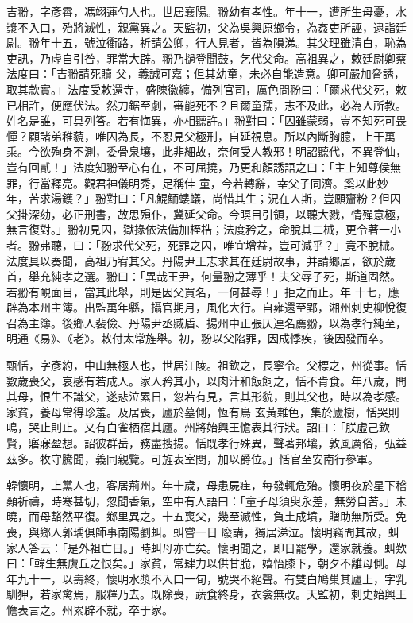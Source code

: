 \begin{pinyinscope}
 吉翂，字彥霄，馮翊蓮勺人也。世居襄陽。翂幼有孝性。年十一，遭所生母憂，水漿不入口，殆將滅性，親黨異之。天監初，父為吳興原鄉令，為姦吏所誣，逮詣廷尉。翂年十五，號泣衢路，祈請公卿，行人見者，皆為隕涕。其父理雖清白，恥為吏訊，乃虛自引咎，罪當大辟。翂乃撾登聞鼓，乞代父命。高祖異之，敕廷尉卿蔡法度曰：「吉翂請死贖
 父，義誠可嘉；但其幼童，未必自能造意。卿可嚴加脅誘，取其款實。」法度受敕還寺，盛陳徽纏，備列官司，厲色問翂曰：「爾求代父死，敕已相許，便應伏法。然刀鋸至劇，審能死不？且爾童孺，志不及此，必為人所教。姓名是誰，可具列答。若有悔異，亦相聽許。」翂對曰：「囚雖蒙弱，豈不知死可畏憚？顧諸弟稚藐，唯囚為長，不忍見父極刑，自延視息。所以內斷胸臆，上干萬乘。今欲殉身不測，委骨泉壤，此非細故，奈何受人教邪！明詔聽代，不異登仙，豈有回貳！」法度知翂至心有在，不可屈撓，乃更和顏誘語之曰：「主上知尊侯無罪，行當釋亮。觀君神儀明秀，足稱佳
 童，今若轉辭，幸父子同濟。奚以此妙年，苦求湯鑊？」翂對曰：「凡鯤鮞螻蟻，尚惜其生；況在人斯，豈願齏粉？但囚父掛深劾，必正刑書，故思殞仆，冀延父命。今瞑目引領，以聽大戮，情殫意極，無言復對。」翂初見囚，獄掾依法備加桎梏；法度矜之，命脫其二械，更令著一小者。翂弗聽，曰：「翂求代父死，死罪之囚，唯宜增益，豈可減乎？」竟不脫械。法度具以奏聞，高祖乃宥其父。丹陽尹王志求其在廷尉故事，并請鄉居，欲於歲首，舉充純孝之選。翂曰：「異哉王尹，何量翂之薄乎！夫父辱子死，斯道固然。若翂有靦面目，當其此舉，則是因父買名，一何甚辱！」拒之而止。年
 十七，應辟為本州主簿。出監萬年縣，攝官期月，風化大行。自雍還至郢，湘州刺史柳悅復召為主簿。後鄉人裴儉、丹陽尹丞臧盾、揚州中正張仄連名薦翂，以為孝行純至，明通《易》、《老》。敕付太常旌舉。初，翂以父陷罪，因成悸疾，後因發而卒。



 甄恬，字彥約，中山無極人也，世居江陵。祖欽之，長寧令。父標之，州從事。恬數歲喪父，哀感有若成人。家人矜其小，以肉汁和飯飼之，恬不肯食。年八歲，問其母，恨生不識父，遂悲泣累日，忽若有見，言其形貌，則其父也，時以為孝感。家貧，養母常得珍羞。及居喪，廬於墓側，恆有鳥
 玄黃雜色，集於廬樹，恬哭則鳴，哭止則止。又有白雀栖宿其廬。州將始興王憺表其行狀。詔曰：「朕虛己欽賢，寤寐盈想。詔彼群岳，務盡搜揚。恬既孝行殊異，聲著邦壤，敦風厲俗，弘益茲多。牧守騰聞，義同親覽。可旌表室閭，加以爵位。」恬官至安南行參軍。



 韓懷明，上黨人也，客居荊州。年十歲，母患屍疰，每發輒危殆。懷明夜於星下稽顙祈禱，時寒甚切，忽聞香氣，空中有人語曰：「童子母須臾永差，無勞自苦。」未曉，而母豁然平復。鄉里異之。十五喪父，幾至滅性，負土成墳，贈助無所受。免喪，與鄉人郭瑀俱師事南陽劉虯。虯嘗一日
 廢講，獨居涕泣。懷明竊問其故，虯家人答云：「是外祖亡日。」時虯母亦亡矣。懷明聞之，即日罷學，還家就養。虯歎曰：「韓生無虞丘之恨矣。」家貧，常肆力以供甘脆，嬉怡膝下，朝夕不離母側。母年九十一，以壽終，懷明水漿不入口一旬，號哭不絕聲。有雙白鳩巢其廬上，字乳馴狎，若家禽焉，服釋乃去。既除喪，蔬食終身，衣衾無改。天監初，刺史始興王憺表言之。州累辟不就，卒于家。




\end{pinyinscope}
